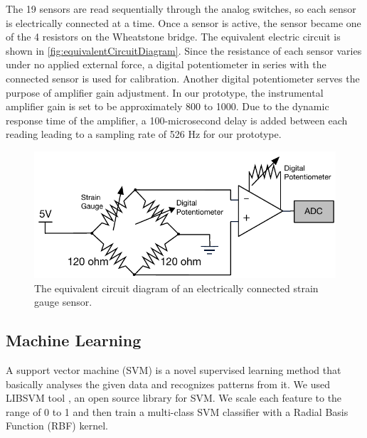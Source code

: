 \documentclass{sigchi}
\begin{document}
The 19 sensors are read sequentially through the analog switches, so each sensor is electrically connected at a time. Once a sensor is active, the sensor became one of the 4 resistors on the Wheatstone bridge. The equivalent electric circuit is shown in \autoref{fig:equivalentCircuitDiagram}. Since the resistance of each sensor varies under no applied external force, a digital potentiometer in series with the connected sensor is used for calibration. Another digital potentiometer serves the purpose of amplifier gain adjustment. In our prototype, the instrumental amplifier gain is set to be approximately 800 to 1000. Due to the dynamic response time of the amplifier, a 100-microsecond delay is added between each reading leading to a sampling rate of 526 Hz for our prototype.

\begin{figure}
  \begin{center}
  \includegraphics[width=1\columnwidth]{figures/EquivalentDiagram.pdf}
  \caption{The equivalent circuit diagram of an electrically connected strain gauge sensor.}
  \label{fig:equivalentCircuitDiagram}
  \end{center}
\end{figure}

\subsection{Machine Learning}
A support vector machine (SVM) is a novel supervised learning method that basically analyses the given data and recognizes patterns from it.
We used LIBSVM tool \cite{CC01a}, an open source library for SVM. 
We scale each feature to the range of 0 to 1 and then train a multi-class SVM classifier with a Radial Basis Function (RBF) kernel.

\end{document}
